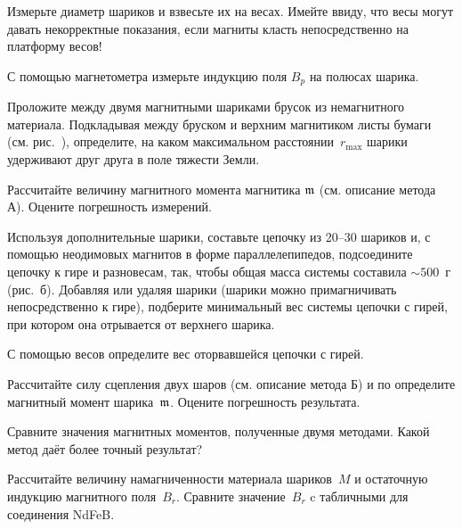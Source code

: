 \begin{lab:task}

\taskpreamble{~}
\vspace*{-8ex} %


\item Измерьте диаметр шариков и взвесьте их на весах. Имейте ввиду, что весы могут давать
некорректные показания, если магниты класть непосредственно на платформу весов!

\item С помощью магнетометра измерьте индукцию поля $B_p$ на полюсах шарика. 
 
\item Проложите между двумя магнитными шариками брусок из немагнитного
материала. Подкладывая между бруском и верхним магнитиком листы бумаги 
(см. рис.~), определите, на каком максимальном 
расстоянии~$r_{\mathrm{max}}$ шарики удерживают друг друга в поле тяжести Земли. 

\item Рассчитайте величину магнитного момента магнитика $\mathfrak{m}$
(см. описание метода А). Оцените погрешность измерений.

\item Используя дополнительные шарики, составьте цепочку из 20--30 шариков и, 
с помощью неодимовых магнитов в форме параллелепипедов, подсоедините цепочку к
гире и разновесам, так, чтобы общая масса системы составила $\sim500$~г 
(рис.~б). 
Добавляя или удаляя шарики (шарики можно примагничивать непосредственно к
гире), подберите минимальный вес системы цепочки с гирей, 
при котором она отрывается от верхнего шарика. 

\item С помощью весов определите вес оторвавшейся цепочки с гирей.

\item Рассчитайте силу сцепления двух шаров (см. описание метода Б) 
и по определите магнитный момент шарика~$\mathfrak{m}$. Оцените погрешность результата.

\item Сравните значения магнитных моментов, полученные двумя методами. 
Какой метод даёт более точный результат?

\item Рассчитайте величину намагниченности материала шариков~$M$
и остаточную индукцию магнитного поля~$B_r$. 
Сравните значение~$B_r$ c табличными для соединения NdFeB.


\end{lab:task}
